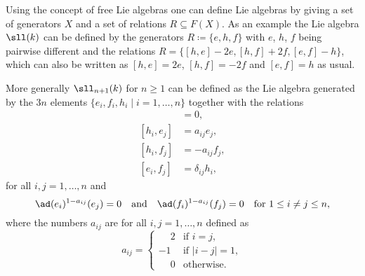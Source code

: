 \begin{remark}
 Using the concept of free Lie algebras one can define Lie algebras by giving a set of generators $X$ and a set of relations $R \subseteq F(X)$. As an example the Lie algebra $\sll(k)$ can be defined by the generators $R \coloneqq \{e,h,f\}$ with $e$, $h$, $f$ being pairwise different and the relations $R = \{[h,e]-2e, [h,f]+2f, [e,f]-h\}$, which can also be written as $[h,e] = 2e$, $[h,f] = -2f$ and $[e,f] = h$ as usual.
 
 More generally $\sll_{n+1}(k)$ for $n \geq 1$ can be defined as the Lie algebra generated by the $3n$ elements $\{e_i, f_i, h_i \mid i = 1, \dotsc, n\}$ together with the relations
 \begin{align*}
  [h_i, h_j] &= 0, \\
  [h_i, e_j] &= a_{ij} e_j, \\
  [h_i, f_j] &= -a_{ij} f_j, \\
  [e_i, f_j] &= \delta_{ij} h_i,
 \end{align*}
 for all $i,j = 1, \dotsc, n$ and
 \[
  \ad(e_i)^{1-a_{ij}}(e_j) = 0
  \quad\text{and}\quad
  \ad(f_i)^{1-a_{ij}}(f_j) = 0
  \quad \text{for $1 \leq i \neq j \leq n$},
 \]
 where the numbers $a_{ij}$ are for all $i,j = 1, \dotsc, n$ defined as
 \[
  a_{ij} =
  \begin{cases}
   \phantom{-}2 & \text{if $i = j$}, \\
             -1 & \text{if $|i-j| = 1$}, \\
   \phantom{-}0 & \text{otherwise}.
  \end{cases}
 \]
\end{remark}


